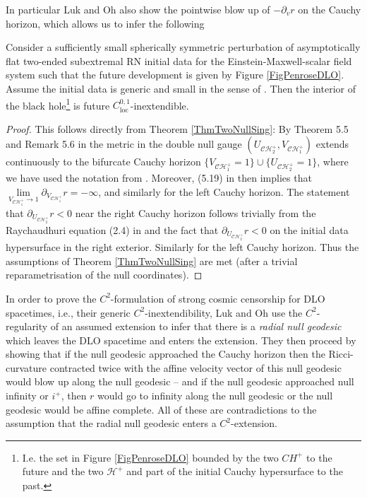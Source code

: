 \documentclass[reqno]{article}
\newcommand{\Hp}{\mathcal{H}^+}
\newcommand{\loc}{\mathrm{loc}}
\newcommand{\rd}{\partial}
\begin{document}
In particular Luk and Oh also show the pointwise blow up of $-\rd_v r$ on the Cauchy horizon, which allows us to infer the following
\begin{theorem} \label{ThmInteriorDLO}
Consider a sufficiently small spherically symmetric perturbation of asymptotically flat two-ended subextremal RN initial data for the Einstein-Maxwell-scalar field system such that the future development is given by Figure \ref{FigPenroseDLO}. Assume the initial data is generic and small in the sense of \cite{LukOh19II}. Then the interior of the black hole\footnote{I.e. the set in Figure \ref{FigPenroseDLO} bounded by the two $CH^+$ to the future and the two $\Hp$ and part of the initial Cauchy hypersurface to the past.} is future $C^{0,1}_{\loc}$-inextendible.
\end{theorem}
\begin{proof}
This follows directly from Theorem \ref{ThmTwoNullSing}: By Theorem 5.5 and Remark 5.6 in \cite{LukOh19I} the metric in the double null gauge $(U_{\mathcal{CH}_2^+}, V_{\mathcal{CH}_1^+})$ extends continuously to the bifurcate Cauchy horizon $\{V_{\mathcal{CH}_1^+}=1\} \cup \{U_{\mathcal{CH}_2^+} = 1\}$, where we have used the notation from \cite{LukOh19I}. Moreover, (5.19) in \cite{LukOh19I} then implies that $\lim\limits_{V_{\mathcal{CH}_1^+} \to 1} \rd_{V_{\mathcal{CH}_1^+}} r = -\infty$, and similarly for the left Cauchy horizon. The statement that $\rd_{U_{\mathcal{CH}_2^+}} r <0$ near the right Cauchy horizon follows trivially from the Raychaudhuri equation (2.4) in \cite{LukOh19I} and the fact that $\rd_{U_{\mathcal{CH}_2^+}} r <0$ on the initial data hypersurface in the right exterior. Similarly for the left Cauchy horizon. Thus the assumptions of Theorem \ref{ThmTwoNullSing} are met (after a trivial reparametrisation of the null coordinates).
\end{proof}
In order to prove the $C^2$-formulation of strong cosmic censorship for DLO spacetimes, i.e., their generic $C^2$-inextendibility, Luk and Oh use the $C^2$-regularity of an assumed extension to infer that there is a \emph{radial null geodesic} which leaves the DLO spacetime and enters the extension. They then proceed by showing that if the null geodesic approached the Cauchy horizon then the Ricci-curvature contracted twice with the affine velocity vector of this null geodesic would blow up along the null geodesic -- and if the null geodesic approached null infinity or $i^+$, then $r$ would go to infinity along the null geodesic or the null geodesic would be affine complete. All of these are contradictions to the assumption that the radial null geodesic enters a $C^2$-extension. 
\end{document}
